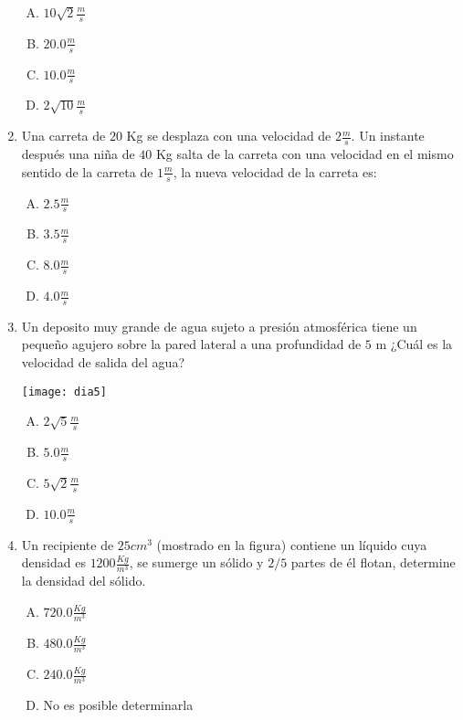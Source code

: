\begin{enumerate}
\begin{enumerate}[(A)]
\item $10\sqrt{2}\frac{m}{s}$
\item $20.0\frac{m}{s}$
\item $10.0\frac{m}{s}$
\item $2\sqrt{10}\frac{m}{s}$
\end{enumerate}

\item Una carreta de $20$ Kg se desplaza con una velocidad de $2\frac{m}{s}$. Un instante después una niña de $40$ Kg salta de la carreta con una velocidad en el mismo sentido de la carreta de $1\frac{m}{s}$, la nueva velocidad de la carreta es: \label{dia-17}

\begin{enumerate}[(A)]
\item $2.5\frac{m}{s}$
\item $3.5\frac{m}{s}$
\item $8.0\frac{m}{s}$
\item $4.0\frac{m}{s}$
\end{enumerate}

\item Un deposito muy grande de agua sujeto a presión atmosférica tiene un pequeño agujero sobre la pared lateral a una profundidad de $5$ m ¿Cuál es la velocidad de salida del agua? \label{dia-18}

\texttt{[image: dia5]}

\begin{enumerate}[(A)]
\item $2\sqrt{5}\frac{m}{s}$
\item $5.0\frac{m}{s}$
\item $5\sqrt{2}\frac{m}{s}$
\item $10.0\frac{m}{s}$
\end{enumerate}

\item Un recipiente de $25cm^3$ (mostrado en la figura) contiene un líquido cuya densidad es $1200\frac{Kg}{m^3}$, se sumerge un sólido y $2/5$ partes de él flotan, determine la densidad del sólido. \label{dia-19}

\begin{enumerate}[(A)]
\item $720.0\frac{Kg}{m^3}$
\item $480.0\frac{Kg}{m^3}$
\item $240.0\frac{Kg}{m^3}$
\item No es posible determinarla
\end{enumerate}


\end{enumerate}
